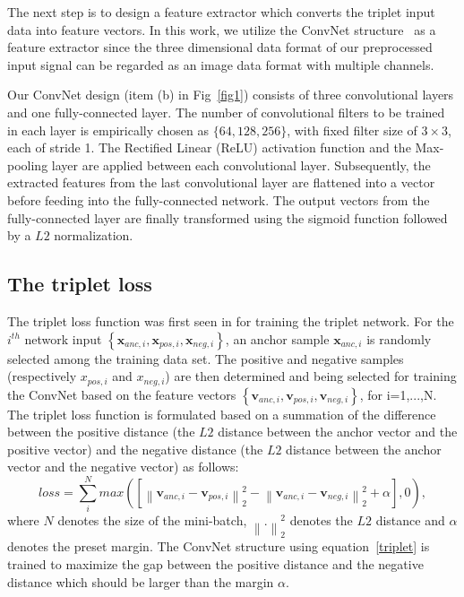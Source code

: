\documentclass{sig-alternate-05-2015}
\begin{document}
The next step is to design a feature extractor which converts the  triplet input data into feature vectors. In this work, we utilize the ConvNet structure~\cite{lecun1998gradient} as a feature extractor since the three dimensional data format of our preprocessed input signal can be regarded as an image data format with multiple channels. 

Our ConvNet design (item (b) in Fig~\ref{fig1}) consists of three convolutional layers and one fully-connected layer. The number of convolutional filters to be trained in each layer is empirically chosen as $\{64, 128, 256\}$, with fixed filter size of $3\times3$, each of stride 1. The Rectiﬁed Linear (ReLU) activation function and the Max-pooling layer are applied between each convolutional layer. Subsequently, the extracted features from the last convolutional layer are flattened into a vector before feeding into the fully-connected network.
The output vectors from the fully-connected layer are finally transformed using the sigmoid function followed by a $L2$ normalization.

\subsection{The triplet loss}

The triplet loss function was first seen in \cite{hoffer2015deep} for training the triplet network. For the $i^{th}$ network input $\left\{\mathbf{x}_{anc,i}, \mathbf{x}_{pos,i}, \mathbf{x}_{neg,i}\right\}$, an anchor sample $\mathbf{x}_{anc,i}$ is randomly selected among the training data set. The positive and negative samples (respectively $x_{pos,i}$ and $x_{neg,i}$) are then determined and being selected for training the ConvNet based on the feature vectors $\left\{\mathbf{v}_{anc,i},\mathbf{v}_{pos,i},\mathbf{v}_{neg,i}\right\}$, for i=1,...,N.
The triplet loss function is formulated based on a summation of the difference between the positive distance (the $L2$ distance between the anchor vector and the positive vector) and the negative distance (the $L2$ distance between the anchor vector and the negative vector) as follows:
\begin{equation}
    loss = \sum_i^N max\left({ \left[ {\left\| {{\mathbf{v}_{anc,i}} - {\mathbf{v}_{pos,i}}} \right\|_2^2} - {\left\| {{\mathbf{v}_{anc,i}} - {\mathbf{v}_{neg,i}}} \right\|_2^2}  + \alpha \right]},0 \right),\label{triplet}
\end{equation}
where $N$ denotes the size of the mini-batch, ${\left\| . \right\|_2^2}$ denotes the $L2$ distance and $\alpha$ denotes the preset margin.
The ConvNet structure using equation~\eqref{triplet} is trained to maximize the gap between the positive distance and the negative distance which should be larger than the margin $\alpha$.
\end{document}
